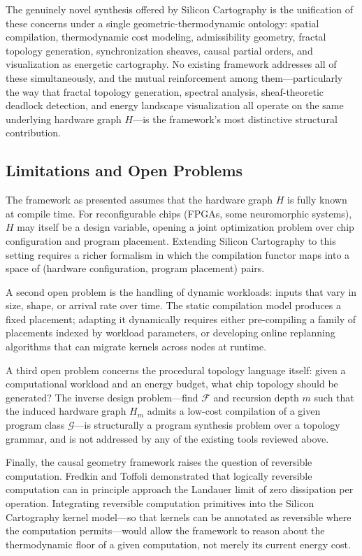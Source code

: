 \documentclass[11pt, a4paper]{article}
\begin{document}
The genuinely novel synthesis offered by Silicon Cartography is the unification of
these concerns under a single geometric-thermodynamic ontology: spatial compilation,
thermodynamic cost modeling, admissibility geometry, fractal topology generation,
synchronization sheaves, causal partial orders, and visualization as energetic
cartography. No existing framework addresses all of these simultaneously, and the
mutual reinforcement among them---particularly the way that fractal topology
generation, spectral analysis, sheaf-theoretic deadlock detection, and energy
landscape visualization all operate on the same underlying hardware graph $H$---is
the framework's most distinctive structural contribution.

\subsection{Limitations and Open Problems}

The framework as presented assumes that the hardware graph $H$ is fully known at
compile time. For reconfigurable chips (FPGAs, some neuromorphic systems), $H$ may
itself be a design variable, opening a joint optimization problem over chip
configuration and program placement. Extending Silicon Cartography to this setting
requires a richer formalism in which the compilation functor maps into a space of
(hardware configuration, program placement) pairs.

A second open problem is the handling of dynamic workloads: inputs that vary
in size, shape, or arrival rate over time. The static compilation model produces
a fixed placement; adapting it dynamically requires either pre-compiling a family
of placements indexed by workload parameters, or developing online replanning
algorithms that can migrate kernels across nodes at runtime.

A third open problem concerns the procedural topology language itself: given a
computational workload and an energy budget, what chip topology should be
generated? The inverse design problem---find $\mathcal{F}$ and recursion depth $m$
such that the induced hardware graph $H_m$ admits a low-cost compilation of a
given program class $\mathcal{G}$---is structurally a program synthesis problem
over a topology grammar, and is not addressed by any of the existing tools
reviewed above.

Finally, the causal geometry framework raises the question of reversible computation.
Fredkin and Toffoli demonstrated that logically reversible computation can in
principle approach the Landauer limit of zero dissipation per operation. Integrating
reversible computation primitives into the Silicon Cartography kernel model---so
that kernels can be annotated as reversible where the computation permits---would
allow the framework to reason about the thermodynamic floor of a given computation,
not merely its current energy cost.
\end{document}
